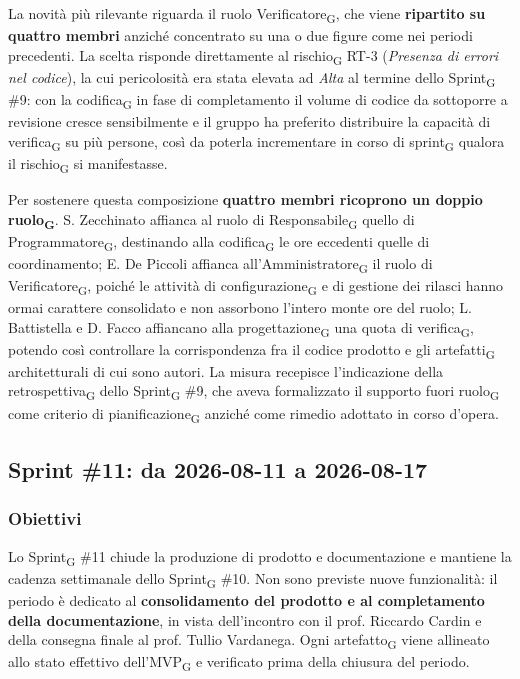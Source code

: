 ﻿\documentclass[a4paper, 10pt, colorlinks=true, linkcolor=black, urlcolor=blue, citecolor=blue, hidelinks]{article}
\begin{document}
La novità più rilevante riguarda il ruolo Verificatore\textsubscript{G}, che viene \textbf{ripartito su quattro membri} anziché concentrato su una o due figure come nei periodi precedenti. La scelta risponde direttamente al rischio\textsubscript{G} RT-3 (\textit{Presenza di errori nel codice}), la cui pericolosità era stata elevata ad \textit{Alta} al termine dello Sprint\textsubscript{G} \#9: con la codifica\textsubscript{G} in fase di completamento il volume di codice da sottoporre a revisione cresce sensibilmente e il gruppo ha preferito distribuire la capacità di verifica\textsubscript{G} su più persone, così da poterla incrementare in corso di sprint\textsubscript{G} qualora il rischio\textsubscript{G} si manifestasse.

Per sostenere questa composizione \textbf{quattro membri ricoprono un doppio ruolo\textsubscript{G}}. S. Zecchinato affianca al ruolo di Responsabile\textsubscript{G} quello di Programmatore\textsubscript{G}, destinando alla codifica\textsubscript{G} le ore eccedenti quelle di coordinamento; E. De Piccoli affianca all'Amministratore\textsubscript{G} il ruolo di Verificatore\textsubscript{G}, poiché le attività di configurazione\textsubscript{G} e di gestione dei rilasci hanno ormai carattere consolidato e non assorbono l'intero monte ore del ruolo; L. Battistella e D. Facco affiancano alla progettazione\textsubscript{G} una quota di verifica\textsubscript{G}, potendo così controllare la corrispondenza fra il codice prodotto e gli artefatti\textsubscript{G} architetturali di cui sono autori. La misura recepisce l'indicazione della retrospettiva\textsubscript{G} dello Sprint\textsubscript{G} \#9, che aveva formalizzato il supporto fuori ruolo\textsubscript{G} come criterio di pianificazione\textsubscript{G} anziché come rimedio adottato in corso d'opera.

\subsection{Sprint \#11: da 2026-08-11 a 2026-08-17}

\subsubsection{Obiettivi}
Lo Sprint\textsubscript{G} \#11 chiude la produzione di prodotto e documentazione e mantiene la cadenza settimanale dello Sprint\textsubscript{G} \#10. Non sono previste nuove funzionalità: il periodo è dedicato al \textbf{consolidamento del prodotto e al completamento della documentazione}, in vista dell'incontro con il prof. Riccardo Cardin e della consegna finale al prof. Tullio Vardanega. Ogni artefatto\textsubscript{G} viene allineato allo stato effettivo dell'MVP\textsubscript{G} e verificato prima della chiusura del periodo.
\end{document}
